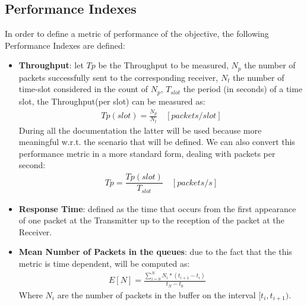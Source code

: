 \subsection{Performance Indexes}
In order to define a metric of performance of the objective, the following Performance Indexes are defined:
\begin{itemize}
	\item \textbf{Throughput}: let $Tp$ be the Throughput to be measured, $N_{p}$ the number of packets successfully sent to the corresponding receiver, $N_{t}$ the number of time-slot considered in the count of $N_{p}$, $T_{slot}$ the period (in seconds) of a time slot, the Throughput(per slot) can be measured as:
	\begin{align*}
	Tp(slot) = \frac{N_{p}}{N_{t}} \quad [packets/slot]
	\end{align*}
	During all the documentation the latter will be used because more meaningful w.r.t. the scenario that will be defined.
	We can also convert this performance metric in a more standard form, dealing with packets per second:
	\begin{align*}
	Tp = \dfrac{Tp(slot)}{T_{slot}} \quad [packets/s]
	\end{align*}
	
	
	\item \textbf{Response Time}: defined as the time that occurs from the first appearance of one packet at the Transmitter up to the reception of the packet at the Receiver.
	
	\item \textbf{Mean Number of Packets in the queues}: due to the fact that the this metric is time dependent, will be computed as:
	\begin{align*}
	E[N] = \frac{\sum_{i = 0}^{N}N_{i}*(t_{i+1} - t_{i})}{t_{N} - t_{0}} \quad 
	\end{align*}
	Where $N_{i}$ are the number of packets in the buffer on the interval $[t_{i}, t_{i+1})$.
\end{itemize}